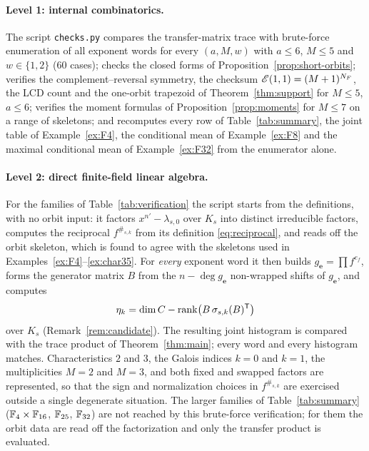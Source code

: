 \paragraph{Level 1: internal combinatorics.}  The script
\texttt{checks.py} compares the transfer-matrix trace with brute-force
enumeration of all exponent words for every $(a,M,w)$ with $a\leq6$, $M\leq5$
and $w\in\{1,2\}$ (60 cases); checks the closed forms of
Proposition~\ref{prop:short-orbits}; verifies the complement--reversal symmetry,
the checksum $\mathscr E(1,1)=(M+1)^{N_F}$, the LCD count and the one-orbit
trapezoid of Theorem~\ref{thm:support} for $M\leq5$, $a\leq6$; verifies the
moment formulas of Proposition~\ref{prop:moments} for $M\leq7$ on a range of
skeletons; and recomputes every row of Table~\ref{tab:summary}, the joint table
of Example~\ref{ex:F4}, the conditional mean of Example~\ref{ex:F8} and the
maximal conditional mean of Example~\ref{ex:F32} from the enumerator alone.

\paragraph{Level 2: direct finite-field linear algebra.}  For the families of
Table~\ref{tab:verification} the script starts from the definitions, with no
orbit input: it factors $x^{n'}-\lambda_{s,0}$ over $K_s$ into distinct
irreducible factors, computes the reciprocal $f^{\#_{s,k}}$ from its definition
\eqref{eq:reciprocal}, and reads off the orbit skeleton, which is found to agree
with the skeletons used in Examples~\ref{ex:F4}--\ref{ex:char35}.  For
\emph{every} exponent word it then builds $g_{\mathbf{e}}=\prod f^{e_f}$, forms
the generator matrix $B$ from the $n-\deg g_{\mathbf{e}}$ non-wrapped shifts of
$g_{\mathbf{e}}$, and computes
\[
\eta_k=\dim C-\operatorname{rank}\bigl(B\,\sigma_{s,k}(B)^{\mathsf T}\bigr)
\]
over $K_s$ (Remark~\ref{rem:candidate}).  The resulting joint histogram is
compared with the trace product of Theorem~\ref{thm:main}; every word and every
histogram matches.  Characteristics $2$ and $3$, the Galois indices $k=0$ and
$k=1$, the multiplicities $M=2$ and $M=3$, and both fixed and swapped factors
are represented, so that the sign and normalization choices in $f^{\#_{s,k}}$
are exercised outside a single degenerate situation.  The larger families of
Table~\ref{tab:summary} ($\mathbb F_4\times\mathbb F_{16}$, $\mathbb F_{25}$, $\mathbb F_{32}$) are not
reached by this brute-force verification; for them the orbit data are read off
the factorization and only the transfer product is evaluated.

